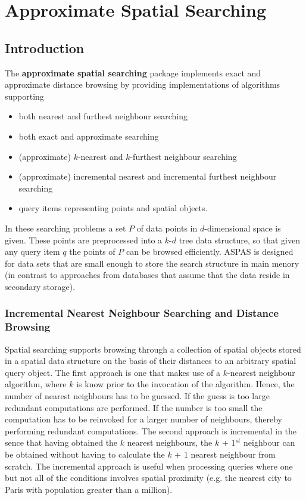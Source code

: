 \chapter{Approximate Spatial Searching}

\section{Introduction}

The {\bf approximate spatial searching} package implements
exact and approximate distance browsing
by providing implementations of algorithms supporting

\begin{itemize} 

\item
both nearest and furthest neighbour searching

\item
both exact and approximate searching

\item 
(approximate) $k$-nearest and $k$-furthest neighbour searching

\item 
(approximate) incremental nearest and incremental furthest neighbour searching

\item
query items representing points and spatial objects.

\end{itemize}

In these searching problems a set $P$ of data points in $d$-dimensional
space is given.
These points are preprocessed into a $k$-$d$ tree data structure, so that given
any query item $q$ the points of $P$ can be browsed efficiently.
ASPAS is designed for data sets that are small enough to store
the search structure in main menory (in contrast to approaches
from databases that assume that the data reside in secondary storage).

\subsection{Incremental Nearest Neighbour Searching and Distance Browsing}

Spatial searching supports browsing through a collection of spatial objects
stored in a spatial data structure on the basis of their distances to an arbitrary spatial
query object. The first approach is one that makes use of a $k$-nearest neighbour
algorithm, where $k$ is know prior to the invocation of the algorithm.
Hence, the number of nearest neighbours has to be
guessed. If the guess is too large redundant computations are performed.
If the number is too small the computation has to be  
reinvoked for a larger number of neighbours, thereby performing redundant computations.
The second approach is incremental in the sence that having obtained
the $k$ nearest neighbours, the $k$ + 1$^{st}$ neighbour can be obtained without
having to calculate the $k$ + 1 nearest neighbour from scratch.
The incremental approach is useful when processing queries where
one but not all of the conditions involves spatial proximity (e.g. the nearest city to Paris with
population greater than a million).

